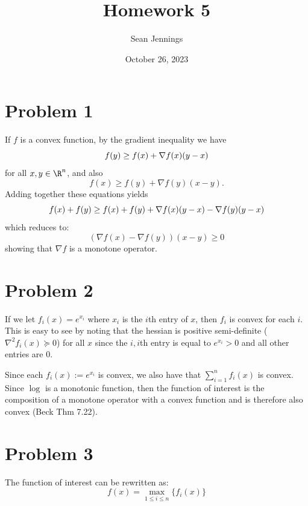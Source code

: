 \documentclass{homework}
\title{Homework 5}
\author{Sean Jennings}
\date{October 26, 2023}
\begin{document}
\maketitle

\section{Problem 1}
If $f$ is a convex function, by the gradient inequality we have
\begin{equation*}
    f(y) \geq f(x) + \nabla f(x) (y - x) \\
\end{equation*}
for all $x,y\in\R^n$, and also
\begin{equation*}
    f(x) \geq f(y) + \nabla f(y) (x - y).
\end{equation*}
Adding together these equations yields
\begin{equation*}
    f(x) + f(y) \geq f(x) + f(y) + \nabla f(x) (y - x) - \nabla f(y) (y - x) \\
\end{equation*}
which reduces to:
\begin{equation*}
    (\nabla f(x) - \nabla f(y)) (x - y) \geq 0
\end{equation*}
showing that $\nabla f$ is a monotone operator.

\section{Problem 2}

If we let $f_i(x) = e^{x_i}$ where $x_i$ is the $i$th entry of $x$, then $f_i$
is convex for each $i$. This is easy to see by noting that the hessian is positive
semi-definite ($\nabla^2 f_i(x) \succeq 0$) for all $x$
since the $i,i$th entry is equal to $e^{x_i} > 0$ and all other entries are 0.

Since each $f_i(x) := e^{x_i}$ is convex, we also have that
$\sum_{i=1}^{n} f_i(x)$ is convex. Since $\log$ is a monotonic function,
then the function of interest is the composition of a monotone operator with
a convex function and is therefore also convex (Beck Thm 7.22).

\section{Problem 3}

The function of interest can be rewritten as:
\begin{equation*}
    f(x) = \max_{1 \leq i \leq n} \{f_i(x)\}
\end{equation*}
\end{document}

